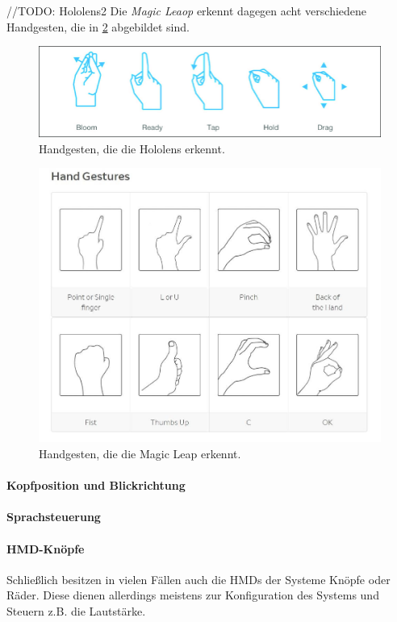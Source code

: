 //TODO: 
Hololens2
Die \textit{Magic Leaop} erkennt dagegen acht verschiedene Handgesten, die in \ref{img:magicGestures} abgebildet sind. 


\begin{figure}
	\centering
	\includegraphics[width=0.7\linewidth]{images/hololensGestures.png}
	\caption{Handgesten, die die Hololens erkennt.}
	\label{img:hololensGestures}
\end{figure}

\begin{figure}
	\centering
	\includegraphics[width=0.7\linewidth]{images/magicleapGestures.jpg}
	\caption{Handgesten, die die Magic Leap erkennt.}
	\label{img:magicGestures}
\end{figure}

\paragraph{Kopfposition und Blickrichtung}

\paragraph{Sprachsteuerung}
\paragraph{HMD-Knöpfe}
Schließlich besitzen in vielen Fällen auch die HMDs der Systeme Knöpfe oder Räder. Diese dienen allerdings meistens zur Konfiguration des Systems und Steuern z.B. die Lautstärke.

